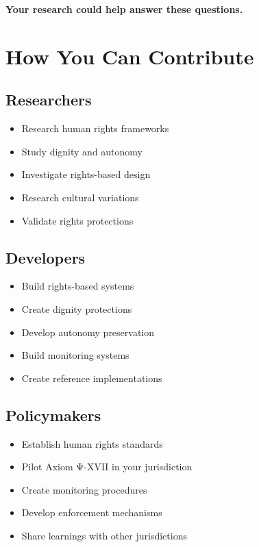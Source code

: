 \textbf{Your research could help answer these questions.}

\vspace{0.5cm}

\section{How You Can Contribute}

\subsection{Researchers}

\begin{itemize}
    \item Research human rights frameworks
    \item Study dignity and autonomy
    \item Investigate rights-based design
    \item Research cultural variations
    \item Validate rights protections
\end{itemize}

\subsection{Developers}

\begin{itemize}
    \item Build rights-based systems
    \item Create dignity protections
    \item Develop autonomy preservation
    \item Build monitoring systems
    \item Create reference implementations
\end{itemize}

\subsection{Policymakers}

\begin{itemize}
    \item Establish human rights standards
    \item Pilot Axiom Ψ-XVII in your jurisdiction
    \item Create monitoring procedures
    \item Develop enforcement mechanisms
    \item Share learnings with other jurisdictions
\end{itemize}

